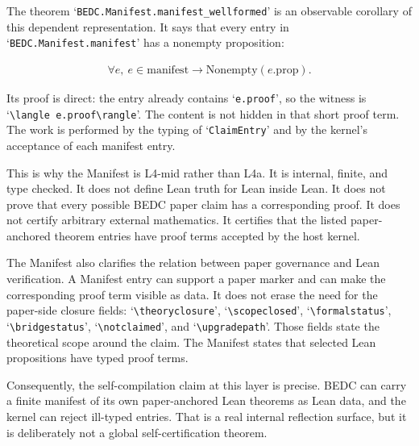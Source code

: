 The theorem `\verb|BEDC.Manifest.manifest_wellformed|' is an observable
corollary of this dependent representation. It says that every entry in
`\verb|BEDC.Manifest.manifest|' has a nonempty proposition:

$$
\begin{aligned}
\forall e,\ e \in \mathrm{manifest}
  \longrightarrow \mathrm{Nonempty}(e.\mathrm{prop}).
\end{aligned}
$$

Its proof is direct: the entry already contains `\verb|e.proof|', so the
witness is `\verb|\langle e.proof\rangle|'. The content is not hidden in that
short proof term. The work is performed by the typing of `\verb|ClaimEntry|'
and by the kernel's acceptance of each manifest entry.

This is why the Manifest is L4-mid rather than L4a. It is internal, finite, and
type checked. It does not define Lean truth for Lean inside Lean. It does not
prove that every possible BEDC paper claim has a corresponding proof. It does
not certify arbitrary external mathematics. It certifies that the listed
paper-anchored theorem entries have proof terms accepted by the host kernel.

The Manifest also clarifies the relation between paper governance and Lean
verification. A Manifest entry can support a paper marker and can make the
corresponding proof term visible as data. It does not erase the need for the
paper-side closure fields: `\verb|\theoryclosure|', `\verb|\scopeclosed|',
`\verb|\formalstatus|', `\verb|\bridgestatus|', `\verb|\notclaimed|', and
`\verb|\upgradepath|'. Those fields state the theoretical scope around the
claim. The Manifest states that selected Lean propositions have typed proof
terms.

Consequently, the self-compilation claim at this layer is precise. BEDC can
carry a finite manifest of its own paper-anchored Lean theorems as Lean data,
and the kernel can reject ill-typed entries. That is a real internal reflection
surface, but it is deliberately not a global self-certification theorem.
